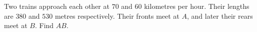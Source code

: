 Two trains approach each other at $70$ and $60$ kilometres per hour. Their lengths are $380$ and $530$ metres respectively. Their fronts meet at $A$, and later their rears meet at $B$. Find $AB$.
